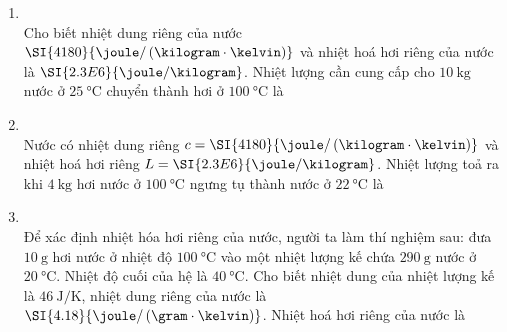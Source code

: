 \begin{enumerate}[label=\bfseries Câu \arabic*:, leftmargin=1.7cm]
\item {}\\
Cho biết nhiệt dung riêng của nước $\SI{4180}{\joule/\left(\kilogram\cdot\kelvin\right)}$ và nhiệt hoá hơi riêng của nước là $\SI{2.3E6}{\joule/\kilogram}$. Nhiệt lượng cần cung cấp cho $\SI{10}{\kilogram}$ nước ở $\SI{25}{\celsius}$ chuyển thành hơi ở $\SI{100}{\celsius}$ là

\item {}\\
Nước có nhiệt dung riêng $c=\SI{4180}{\joule/\left(\kilogram\cdot\kelvin\right)}$ và nhiệt hoá hơi riêng $L=\SI{2.3E6}{\joule/\kilogram}$. Nhiệt lượng toả ra khi $\SI{4}{\kilogram}$ hơi nước ở $\SI{100}{\celsius}$ ngưng tụ thành nước ở $\SI{22}{\celsius}$ là 

\item {}\\
Để xác định nhiệt hóa hơi riêng của nước, người ta làm thí nghiệm sau: đưa $\SI{10}{\gram}$ hơi nước ở nhiệt độ $\SI{100}{\celsius}$ vào một nhiệt lượng kế chứa $\SI{290}{\gram}$ nước ở $\SI{20}{\celsius}$. Nhiệt độ cuối của hệ là $\SI{40}{\celsius}$. Cho biết nhiệt dung của nhiệt lượng kế là  $\SI{46}{\joule/\kelvin}$, nhiệt dung riêng của nước là $\SI{4.18}{\joule/\left(\gram\cdot\kelvin\right)}$. Nhiệt hoá hơi riêng của nước là 


\end{enumerate}
